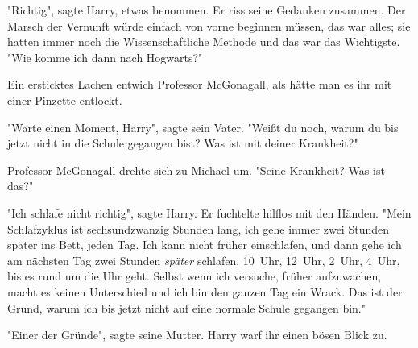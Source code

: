 "Richtig", sagte Harry, etwas benommen. Er riss seine Gedanken zusammen. Der Marsch der Vernunft würde einfach von vorne beginnen müssen, das war alles; sie hatten immer noch die Wissenschaftliche Methode und das war das Wichtigste. "Wie komme ich dann nach Hogwarts?"

Ein ersticktes Lachen entwich Professor McGonagall, als hätte man es ihr mit einer Pinzette entlockt.

"Warte einen Moment, Harry", sagte sein Vater. "Weißt du noch, warum du bis jetzt nicht in die Schule gegangen bist? Was ist mit deiner Krankheit?"

Professor McGonagall drehte sich zu Michael um. "Seine Krankheit? Was ist das?"

"Ich schlafe nicht richtig", sagte Harry. Er fuchtelte hilflos mit den Händen. "Mein Schlafzyklus ist sechsundzwanzig Stunden lang, ich gehe immer zwei Stunden später ins Bett, jeden Tag. Ich kann nicht früher einschlafen, und dann gehe ich am nächsten Tag zwei Stunden \emph{später} schlafen. 10~Uhr, 12~Uhr, 2~Uhr, 4~Uhr, bis es rund um die Uhr geht. Selbst wenn ich versuche, früher aufzuwachen, macht es keinen Unterschied und ich bin den ganzen Tag ein Wrack. Das ist der Grund, warum ich bis jetzt nicht auf eine normale Schule gegangen bin."

"Einer der Gründe", sagte seine Mutter. Harry warf ihr einen bösen Blick zu.

